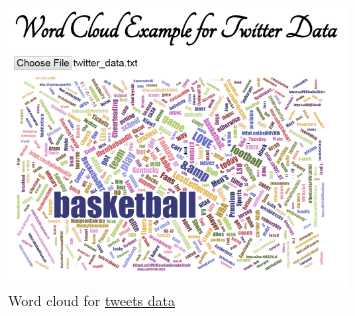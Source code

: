 \documentclass[a4paper, 11pt]{article}
\begin{document}
\vspace{8pt}
\begin{figure}[h!]
  \centering
      \includegraphics[width=0.8\textwidth]{word_cloud.png}
  \caption{Word cloud for \href{http://nymph332088.github.io/CIS4340/labassignments/Lab2/twitter_data.txt}{tweets data}}
  \label{fig:wordcloud}
\end{figure}
\end{document}
